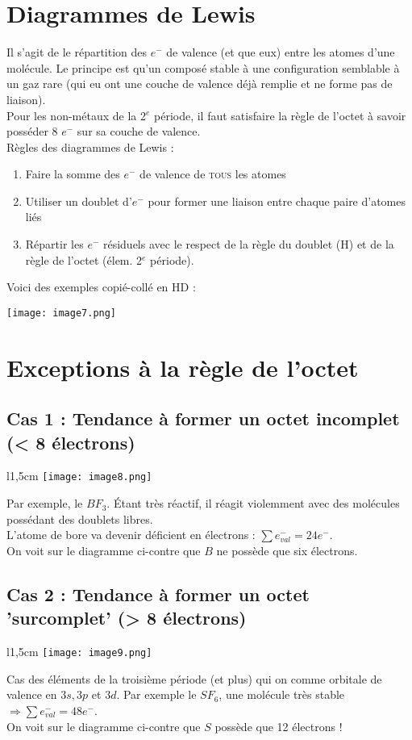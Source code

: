 \documentclass[british,french,11pt, a4paper, openany]{book}
\begin{document}
\section{Diagrammes de Lewis}
Il s'agit de le répartition des $e^-$ de valence (et que eux) entre les atomes d'une molécule. Le principe est qu'un composé stable à une configuration semblable à un gaz rare (qui eu ont une couche de valence déjà remplie et ne forme pas de liaison).\\

Pour les non-métaux de la 2$^e$ période, il faut satisfaire la règle de l'octet à savoir posséder 8 $e^-$ sur sa couche de valence.\\
Règles des diagrammes de Lewis :
\begin{enumerate}
	\item Faire la somme des $e^-$ de valence de \textsc{tous} les atomes
	\item Utiliser un doublet d'$e^-$ pour former une liaison entre chaque paire d'atomes liés
	\item Répartir les $e^-$ résiduels avec le respect de la règle du doublet (H) et de la règle de l'octet (élem. 2$^e$ période).
\end{enumerate}
Voici des exemples copié-collé en HD : 
\begin{center}
	\texttt{[image: image7.png]}\\
\end{center}

\section{Exceptions à la règle de l'octet}
\subsection{Cas 1 :  Tendance à former un octet incomplet (< 8 électrons)}
\begin{wrapfigure}[4]{l}{1,5cm}
	\texttt{[image: image8.png]}
\end{wrapfigure}
Par exemple, le $BF_3$. Étant très réactif, il réagit violemment avec des molécules possédant des doublets libres.\\
L'atome de bore va devenir déficient en électrons : $\sum e^-_{val} = 24 e^-$.\\
On voit sur le diagramme ci-contre que $B$ ne possède que six électrons.

\subsection{Cas 2 :  Tendance à former un octet 'surcomplet' (> 8 électrons)}
\begin{wrapfigure}[6]{l}{1,5cm}
	\texttt{[image: image9.png]}
\end{wrapfigure}
Cas des éléments de la troisième période (et plus) qui on comme orbitale de valence en $3s, 3p$ et $3d$. Par exemple le $SF_6$, une molécule très stable\\
$\Rightarrow \sum e^-_{val} = 48 e^-$.\\
On voit sur le diagramme ci-contre que $S$ possède que 12 électrons !\\
\end{document}
